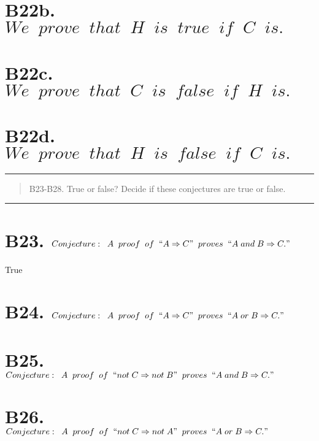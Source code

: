 \section*{B22b. $We \;\; prove \;\; that \;\; H \;\; is \;\; true \;\; if \;\; C \;\; is.$}

\section*{B22c. $We \;\; prove \;\; that \;\; C \;\; is \;\; false \;\; if \;\; H \;\; is.$}

\section*{B22d. $We \;\; prove \;\; that \;\; H \;\; is \;\; false \;\; if \;\; C \;\; is.$}

\hfill
\bgroup
\color{abs}
\hrule
\egroup

\begin{abstract}
	B23-B28. True or false? Decide if these conjectures are true or false.
	
	\noindent\textbf{}
	
\end{abstract}

\bgroup
\color{abs}
\hrule
\egroup

\section*{B23. $Conjecture: \;\; A \;\; proof \;\; of \;\; ``A \Rightarrow C" \;\; proves \;\; ``A \; and \; B \Rightarrow C."$}
True

\section*{B24. $Conjecture: \;\; A \;\; proof \;\; of \;\; ``A \Rightarrow C" \;\; proves \;\; ``A \; or \; B \Rightarrow C."$}

\section*{B25. $Conjecture: \;\; A \;\; proof \;\; of \;\; ``not \; C \Rightarrow not \; B" \;\; proves \;\; ``A \; and \; B \Rightarrow C."$}

\section*{B26. $Conjecture: \;\; A \;\; proof \;\; of \;\; ``not \; C \Rightarrow not \; A" \;\; proves \;\; ``A \; or \; B \Rightarrow C."$}

